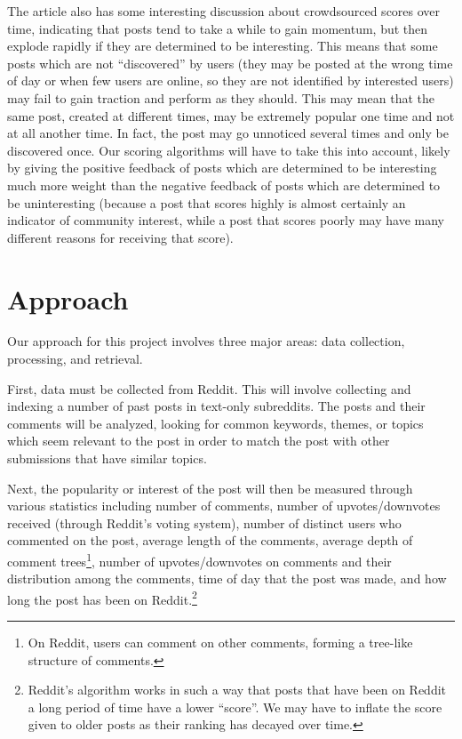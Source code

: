 \documentclass{acm_proc_article-sp}
\begin{document}
The article also has some
interesting discussion about crowdsourced scores over time, indicating that posts tend
to take a while to gain momentum, but then explode rapidly if they are determined to
be interesting.  This means that some posts which are not ``discovered'' by users (they
may be posted at the wrong time of day or when few users are online, so they are not
identified by interested users) may fail to gain traction and perform as they should.
This may mean that the same post, created at different times, may be extremely popular
one time and not at all another time.  In fact, the post may go unnoticed several times
and only be discovered once.  Our scoring algorithms will have to take this
into account, likely by giving the positive feedback of posts which are determined to
be interesting much more weight than the negative feedback of posts which are determined
to be uninteresting (because a post that scores highly is almost certainly
an indicator of community interest, while a post that scores poorly may have many
different reasons for receiving that score).

\section{Approach}
Our approach for this project involves three major areas: data collection, processing, and retrieval.

First, data must be collected from Reddit.  This will involve collecting and indexing a number of past posts
in text-only subreddits.  The posts and their comments will be analyzed, looking for common keywords,
themes, or topics which seem relevant to the post in order to match the post with other submissions
that have similar topics.

Next, the popularity or interest of the post will then be measured through various statistics including
number of comments, number of upvotes/downvotes received (through Reddit's voting system), number
of distinct users who commented on the post, average length of the comments, average depth of
comment trees\footnote{On Reddit, users can comment on other comments, forming a tree-like structure of comments.},
number of upvotes/downvotes on comments and their distribution among the comments, time of day that the post was made,
and how long the post has been on Reddit.\footnote{Reddit's algorithm works in such a way that posts that have been on Reddit
a long period of time have a lower ``score''. We may have to inflate the score given to older posts as their ranking
has decayed over time.}
\end{document}
